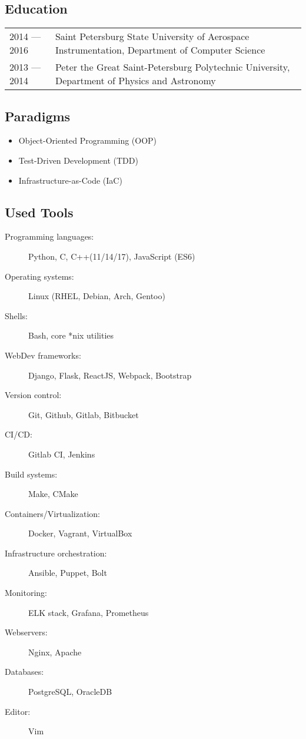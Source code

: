 \documentclass[11pt]{report}
\begin{document}
\subsection*{Education}
\begin{table}[H]
    \begin{tabular}{@{}p{}p{}}
        2014 --- 2016 & Saint Petersburg State University of Aerospace Instrumentation, Department of Computer Science \\
        2013 --- 2014 & Peter the Great Saint-Petersburg Polytechnic University, Department of Physics and Astronomy
    \end{tabular}
\end{table}

\subsection*{Paradigms}
\begin{itemize}
    \item Object-Oriented Programming (OOP)
    \item Test-Driven Development (TDD)
    \item Infrastructure-as-Code (IaC)
\end{itemize}

\subsection*{Used Tools}
\begin{description}
    \item[Programming languages:]
    Python, C, C++(11/14/17), JavaScript (ES6)
    \item[Operating systems:]
    Linux (RHEL, Debian, Arch, Gentoo)
    \item[Shells:]
    Bash, core *nix utilities
    \item[WebDev frameworks:]
    Django, Flask, ReactJS, Webpack, Bootstrap
    \item[Version control:]
    Git, Github, Gitlab, Bitbucket
    \item[CI/CD:]
    Gitlab CI, Jenkins
    \item[Build systems:]
    Make, CMake
    \item[Containers/Virtualization:]
    Docker, Vagrant, VirtualBox
    \item[Infrastructure orchestration:]
    Ansible, Puppet, Bolt
    \item[Monitoring:]
    ELK stack, Grafana, Prometheus
    \item[Webservers:]
    Nginx, Apache
    \item[Databases:]
    PostgreSQL, OracleDB
    \item[Editor:]
    Vim
\end{description}
\end{document}
